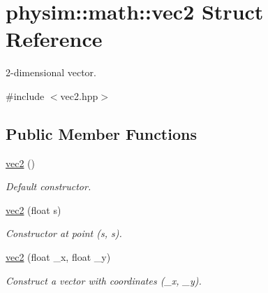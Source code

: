 \hypertarget{structphysim_1_1math_1_1vec2}{}\section{physim\+:\+:math\+:\+:vec2 Struct Reference}
\label{structphysim_1_1math_1_1vec2}


2-\/dimensional vector.  




{\ttfamily \#include $<$vec2.\+hpp$>$}

\subsection*{Public Member Functions}
\begin{DoxyCompactItemize}
\item 
\mbox{\label{structphysim_1_1math_1_1vec2_a8f8e152af8eb295fa150d17c5a07ed1c}} 
\hyperlink{structphysim_1_1math_1_1vec2_a8f8e152af8eb295fa150d17c5a07ed1c}{vec2} ()
\begin{DoxyCompactList}\small\item\em Default constructor. \end{DoxyCompactList}\item 
\mbox{\label{structphysim_1_1math_1_1vec2_a283d5de9045f7b9e9505a4c999deb2f5}} 
\hyperlink{structphysim_1_1math_1_1vec2_a283d5de9045f7b9e9505a4c999deb2f5}{vec2} (float s)
\begin{DoxyCompactList}\small\item\em Constructor at point ({\itshape s}, {\itshape s}). \end{DoxyCompactList}\item 
\mbox{\label{structphysim_1_1math_1_1vec2_a7385c6320bf56780c7a149443354c219}} 
\hyperlink{structphysim_1_1math_1_1vec2_a7385c6320bf56780c7a149443354c219}{vec2} (float \+\_\+x, float \+\_\+y)
\begin{DoxyCompactList}\small\item\em Construct a vector with coordinates ({\itshape \+\_\+x}, {\itshape \+\_\+y}). \end{DoxyCompactList}\item 
\mbox{\label{structphysim_1_1math_1_1vec2_aea8c472b774827fe81ee8cde5ba81aef}} 

\end{DoxyCompactItemize}
